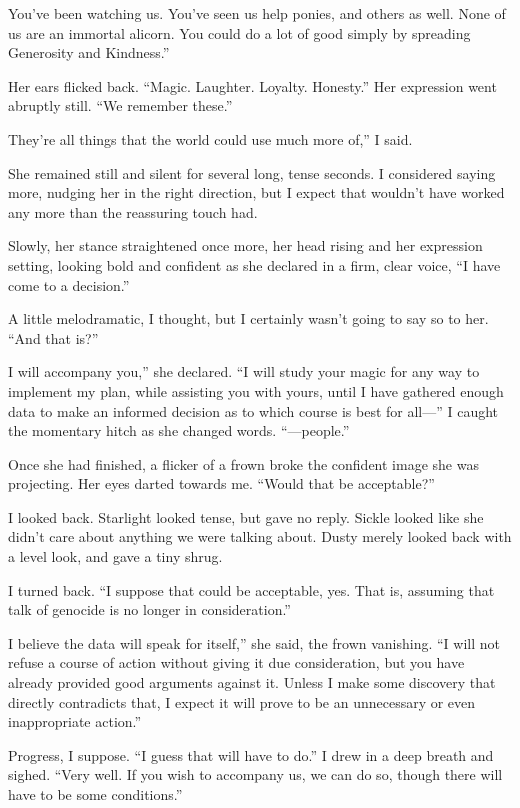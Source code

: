 \leavevmode{}You’ve been watching us. You’ve seen us help ponies, and others as well. None of us are an immortal alicorn. You could do a lot of good simply by spreading Generosity and Kindness.”

Her ears flicked back. “Magic. Laughter. Loyalty. Honesty.” Her expression went abruptly still. “We remember these.”

\leavevmode{}They’re all things that the world could use much more of,” I said.

She remained still and silent for several long, tense seconds. I considered saying more, nudging her in the right direction, but I expect that wouldn’t have worked any more than the reassuring touch had.

Slowly, her stance straightened once more, her head rising and her expression setting, looking bold and confident as she declared in a firm, clear voice, “I have come to a decision.”

A little melodramatic, I thought, but I certainly wasn’t going to say so to her. “And that is?”

\leavevmode{}I will accompany you,” she declared. “I will study your magic for any way to implement my plan, while assisting you with yours, until I have gathered enough data to make an informed decision as to which course is best for all—” I caught the momentary hitch as she changed words. “—people.”

Once she had finished, a flicker of a frown broke the confident image she was projecting. Her eyes darted towards me. “Would that be acceptable?”

I looked back. Starlight looked tense, but gave no reply. Sickle looked like she didn’t care about anything we were talking about. Dusty merely looked back with a level look, and gave a tiny shrug.

I turned back. “I suppose that could be acceptable, yes. That is, assuming that talk of genocide is no longer in consideration.”

\leavevmode{}I believe the data will speak for itself,” she said, the frown vanishing. “I will not refuse a course of action without giving it due consideration, but you have already provided good arguments against it. Unless I make some discovery that directly contradicts that, I expect it will prove to be an unnecessary or even inappropriate action.”

Progress, I suppose. “I guess that will have to do.” I drew in a deep breath and sighed. “Very well. If you wish to accompany us, we can do so, though there will have to be some conditions.”

